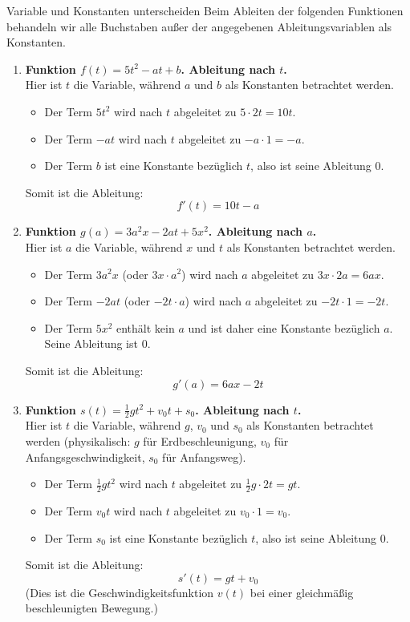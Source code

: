 \begin{loesungsumgebung}{Variable und Konstanten unterscheiden}
Beim Ableiten der folgenden Funktionen behandeln wir alle Buchstaben außer der angegebenen Ableitungsvariablen als Konstanten.

\begin{enumerate}[label=(\alph*)]
    \item \textbf{Funktion $f(t) = 5t^2 - at + b$. Ableitung nach $t$.} \\
    Hier ist $t$ die Variable, während $a$ und $b$ als Konstanten betrachtet werden.
    \begin{itemize}
        \item Der Term $5t^2$ wird nach $t$ abgeleitet zu $5 \cdot 2t = 10t$.
        \item Der Term $-at$ wird nach $t$ abgeleitet zu $-a \cdot 1 = -a$.
        \item Der Term $b$ ist eine Konstante bezüglich $t$, also ist seine Ableitung $0$.
    \end{itemize}
    Somit ist die Ableitung:
    $$ f'(t) = 10t - a $$

    \item \textbf{Funktion $g(a) = 3a^2x - 2at + 5x^2$. Ableitung nach $a$.} \\
    Hier ist $a$ die Variable, während $x$ und $t$ als Konstanten betrachtet werden.
    \begin{itemize}
        \item Der Term $3a^2x$ (oder $3x \cdot a^2$) wird nach $a$ abgeleitet zu $3x \cdot 2a = 6ax$.
        \item Der Term $-2at$ (oder $-2t \cdot a$) wird nach $a$ abgeleitet zu $-2t \cdot 1 = -2t$.
        \item Der Term $5x^2$ enthält kein $a$ und ist daher eine Konstante bezüglich $a$. Seine Ableitung ist $0$.
    \end{itemize}
    Somit ist die Ableitung:
    $$ g'(a) = 6ax - 2t $$

    \item \textbf{Funktion $s(t) = \frac{1}{2}gt^2 + v_0 t + s_0$. Ableitung nach $t$.} \\
    Hier ist $t$ die Variable, während $g$, $v_0$ und $s_0$ als Konstanten betrachtet werden (physikalisch: $g$ für Erdbeschleunigung, $v_0$ für Anfangsgeschwindigkeit, $s_0$ für Anfangsweg).
    \begin{itemize}
        \item Der Term $\frac{1}{2}gt^2$ wird nach $t$ abgeleitet zu $\frac{1}{2}g \cdot 2t = gt$.
        \item Der Term $v_0 t$ wird nach $t$ abgeleitet zu $v_0 \cdot 1 = v_0$.
        \item Der Term $s_0$ ist eine Konstante bezüglich $t$, also ist seine Ableitung $0$.
    \end{itemize}
    Somit ist die Ableitung:
    $$ s'(t) = gt + v_0 $$
    (Dies ist die Geschwindigkeitsfunktion $v(t)$ bei einer gleichmäßig beschleunigten Bewegung.)


\end{enumerate}
\end{loesungsumgebung}
